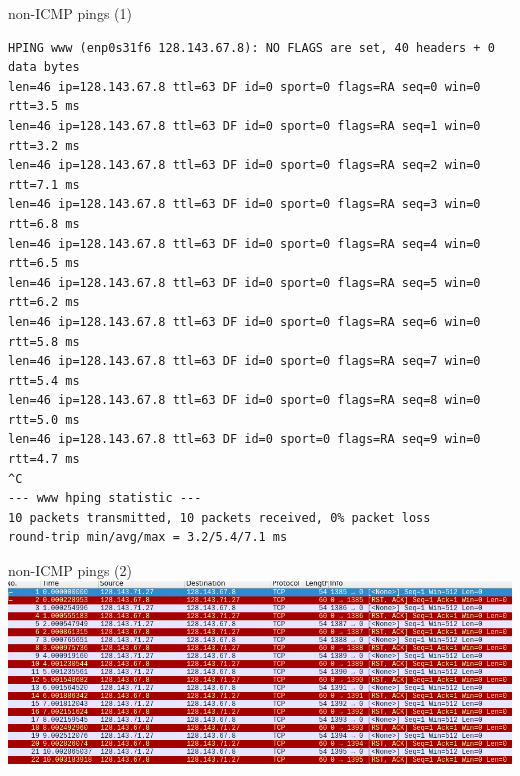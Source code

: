 \begin{frame}[fragile]{non-ICMP pings (1)}
\begin{Verbatim}[fontsize=\fontsize{10}{11}]
HPING www (enp0s31f6 128.143.67.8): NO FLAGS are set, 40 headers + 0 data bytes                          
len=46 ip=128.143.67.8 ttl=63 DF id=0 sport=0 flags=RA seq=0 win=0 rtt=3.5 ms                            
len=46 ip=128.143.67.8 ttl=63 DF id=0 sport=0 flags=RA seq=1 win=0 rtt=3.2 ms                            
len=46 ip=128.143.67.8 ttl=63 DF id=0 sport=0 flags=RA seq=2 win=0 rtt=7.1 ms                            
len=46 ip=128.143.67.8 ttl=63 DF id=0 sport=0 flags=RA seq=3 win=0 rtt=6.8 ms                            
len=46 ip=128.143.67.8 ttl=63 DF id=0 sport=0 flags=RA seq=4 win=0 rtt=6.5 ms                            
len=46 ip=128.143.67.8 ttl=63 DF id=0 sport=0 flags=RA seq=5 win=0 rtt=6.2 ms                            
len=46 ip=128.143.67.8 ttl=63 DF id=0 sport=0 flags=RA seq=6 win=0 rtt=5.8 ms                            
len=46 ip=128.143.67.8 ttl=63 DF id=0 sport=0 flags=RA seq=7 win=0 rtt=5.4 ms                            
len=46 ip=128.143.67.8 ttl=63 DF id=0 sport=0 flags=RA seq=8 win=0 rtt=5.0 ms                            
len=46 ip=128.143.67.8 ttl=63 DF id=0 sport=0 flags=RA seq=9 win=0 rtt=4.7 ms                            
^C                                                                                                       
--- www hping statistic ---                                                                              
10 packets transmitted, 10 packets received, 0% packet loss                                              
round-trip min/avg/max = 3.2/5.4/7.1 ms
\end{Verbatim}
\end{frame}

\begin{frame}[fragile]{non-ICMP pings (2)}
\includegraphics[width=\textwidth]{../perf/hping-wireshark}
\end{frame}


